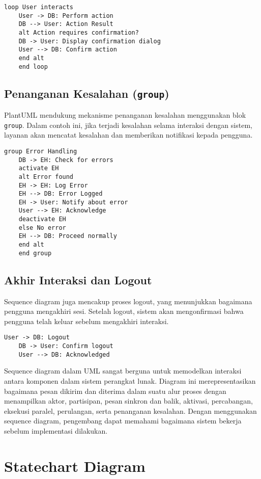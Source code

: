 \begin{lstlisting}[language=puml]
	loop User interacts
	User -> DB: Perform action
	DB --> User: Action Result
	alt Action requires confirmation?
	DB -> User: Display confirmation dialog
	User --> DB: Confirm action
	end alt
	end loop
\end{lstlisting}

\subsection{Penanganan Kesalahan (\texttt{group})}
PlantUML mendukung mekanisme penanganan kesalahan menggunakan blok \texttt{group}. Dalam contoh ini, jika terjadi kesalahan selama interaksi dengan sistem, layanan akan mencatat kesalahan dan memberikan notifikasi kepada pengguna.

\begin{lstlisting}[language=puml]
	group Error Handling
	DB -> EH: Check for errors
	activate EH
	alt Error found
	EH -> EH: Log Error
	EH --> DB: Error Logged
	EH -> User: Notify about error
	User --> EH: Acknowledge
	deactivate EH
	else No error
	EH --> DB: Proceed normally
	end alt
	end group
\end{lstlisting}

\subsection{Akhir Interaksi dan Logout}
Sequence diagram juga mencakup proses logout, yang menunjukkan bagaimana pengguna mengakhiri sesi. Setelah logout, sistem akan mengonfirmasi bahwa pengguna telah keluar sebelum mengakhiri interaksi.

\begin{lstlisting}[language=puml]
	User -> DB: Logout
	DB -> User: Confirm logout
	User --> DB: Acknowledged
\end{lstlisting}

Sequence diagram dalam UML sangat berguna untuk memodelkan interaksi antara komponen dalam sistem perangkat lunak. Diagram ini merepresentasikan bagaimana pesan dikirim dan diterima dalam suatu alur proses dengan menampilkan aktor, partisipan, pesan sinkron dan balik, aktivasi, percabangan, eksekusi paralel, perulangan, serta penanganan kesalahan. Dengan menggunakan sequence diagram, pengembang dapat memahami bagaimana sistem bekerja sebelum implementasi dilakukan.



\section{Statechart Diagram}

